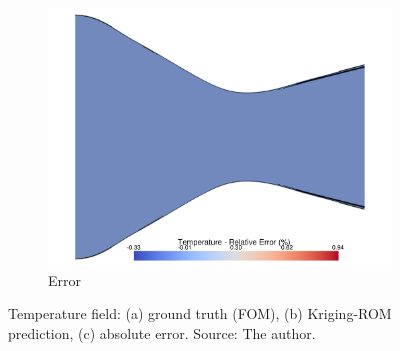 \documentclass[tg, EN]{ufabcFHZh_tg}
\begin{document}
\begin{figure}[H]
\begin{subfigure}[b]{0.32\textwidth}
        \includegraphics[width=\textwidth]{Figuras/kriging_error_temperature.pdf}
        \caption{Error}
    \end{subfigure}
    \caption{Temperature field: (a) ground truth (FOM), (b) Kriging-ROM prediction, (c) absolute error. Source: The author.}
    \label{fig:kriging_reconstruction_temperature}
\end{figure}
\end{document}
